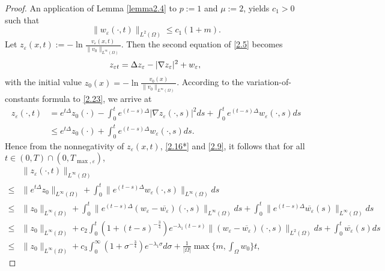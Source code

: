 \documentclass[12pt]{article}
\theoremstyle{plain}
\theoremstyle{definition}
\numberwithin{equation}{section}
\begin{document}
\begin{proof}[Proof]
An application of Lemma \ref{lemma2.4} to $p:=1$ and $\mu:=2$, yields $c_1>0$ such that
 \begin{equation}\label{2.16*}
 \|w_\varepsilon(\cdot,t)\|_{L^2(\Omega)}\leq c_1(1+m).
 \end{equation}
Let
$z_\varepsilon(x,t):=-\ln\frac{v_\varepsilon(x,t)}{\|v_0\|_{L^\infty(\Omega)}}.$
Then the second equation of \eqref{2.5}  becomes
\begin{equation}\label{2.23}
         z_{\varepsilon t}=\Delta z_\varepsilon-|\nabla z_\varepsilon|^2+w_\varepsilon,\\
    \end{equation}
      with the initial value $z_0(x)=-\ln\frac{v_0(x)}{\|v_0\|_{L^\infty(\Omega)}}$.
	According to the variation-of-constants formula to \eqref{2.23}, we arrive at
	\begin{equation*}
		\begin{split}
			z_\varepsilon(\cdot,t)&=e^{t\Delta}z_0(\cdot)-\int_{0}^{t}e^{(t-s)\Delta}|\nabla z_\varepsilon(\cdot,s)|^{2}ds+\int_{0}^{t}e^{(t-s)\Delta}w_\varepsilon(\cdot,s)ds\\
&\leq e^{t\Delta}z_0(\cdot)+\int_{0}^{t}e^{(t-s)\Delta}w_\varepsilon(\cdot,s)ds.
		\end{split}
	\end{equation*}
 Hence from the nonnegativity of $z_\varepsilon(x,t)$, \eqref{2.16*} and \eqref{2.9}, it follows that for all $t\in(0,T)\cap(0,T_{\max,\varepsilon})$,
	\begin{align}\label{2.24}
		&\|z_\varepsilon(\cdot,t)\|_{L^{\infty}(\Omega)}\nonumber\\
\leq
&\|e^{t\Delta}z_{0}\|_{L^{\infty}(\Omega)}+\int_{0}^{t}\|e^{(t-s)\Delta}
w_\varepsilon(\cdot,s)\|_{L^{\infty}(\Omega)}ds\nonumber\\
			\leq
&\|z_{0}\|_{L^{\infty}(\Omega)}+\int_{0}^{t}\|e^{(t-s)\Delta}(w_\varepsilon-\overline{w_\varepsilon})(\cdot,s)
\|_{L^{\infty}(\Omega)}ds+\int_{0}^{t}\|e^{(t-s)\Delta}
\overline{w_\varepsilon}(s)\|_{L^{\infty}(\Omega)}ds\\
			\leq
&
\|z_{0}\|_{L^{\infty}(\Omega)}+c_2\int_{0}^{t}(1+(t-s)^{-\frac{3}{4}})e^{-\lambda_{1}(t-s)}\|(w_\varepsilon-\overline{w_\varepsilon})(\cdot,s)\|_{L^{2}(\Omega)}ds+ \int_{0}^{t}\overline{w_\varepsilon}(s)ds\nonumber\\
\leq&\|z_{0}\|_{L^{\infty}(\Omega)}+c_3\int_{0}^{\infty}(1+\sigma^{-\frac{3}{4}})e^{-\lambda_{1}\sigma}d\sigma+\frac 1{|\Omega|}\max\bigg\{m,\int_{\Omega}w_0\bigg\}t,\nonumber

\end{align}
\end{proof}
\end{document}

